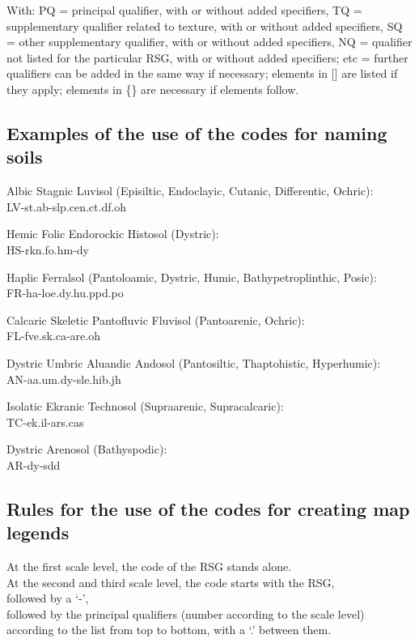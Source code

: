 \documentclass[
  letterpaper,
  DIV=11,
  numbers=noendperiod]{scrreprt}
\begin{document}
With: PQ = principal qualifier, with or without added specifiers, TQ =
supplementary qualifier related to texture, with or without added
specifiers, SQ = other supplementary qualifier, with or without added
specifiers, NQ = qualifier not listed for the particular RSG, with or
without added specifiers; etc = further qualifiers can be added in the
same way if necessary; elements in {[}{]} are listed if they apply;
elements in \{\} are necessary if elements follow.

\hypertarget{examples-of-the-use-of-the-codes-for-naming-soils}{%
\subsection{Examples of the use of the codes for naming
soils}\label{examples-of-the-use-of-the-codes-for-naming-soils}}

Albic Stagnic Luvisol (Episiltic, Endoclayic, Cutanic, Differentic,
Ochric):\\
LV-st.ab-slp.cen.ct.df.oh

Hemic Folic Endorockic Histosol (Dystric):\\
HS-rkn.fo.hm-dy

Haplic Ferralsol (Pantoloamic, Dystric, Humic, Bathypetroplinthic,
Posic):\\
FR-ha-loe.dy.hu.ppd.po

Calcaric Skeletic Pantofluvic Fluvisol (Pantoarenic, Ochric):\\
FL-fve.sk.ca-are.oh

Dystric Umbric Aluandic Andosol (Pantosiltic, Thaptohistic,
Hyperhumic):\\
AN-aa.um.dy-sle.hib.jh

Isolatic Ekranic Technosol (Supraarenic, Supracalcaric):\\
TC-ek.il-ars.cas

Dystric Arenosol (Bathyspodic):\\
AR-dy-sdd

\hypertarget{rules-for-the-use-of-the-codes-for-creating-map-legends}{%
\subsection{Rules for the use of the codes for creating map
legends}\label{rules-for-the-use-of-the-codes-for-creating-map-legends}}

At the first scale level, the code of the RSG stands alone.\\
At the second and third scale level, the code starts with the RSG,\\
followed by a `-',\\
followed by the principal qualifiers (number according to the scale
level) according to the list from top to bottom, with a `.' between
them.
\end{document}

